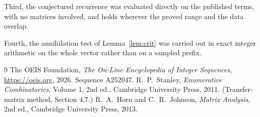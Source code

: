 \documentclass[11pt,a4paper]{article}
\theoremstyle{plain}
\theoremstyle{definition}
\begin{document}
Third, the conjectured recurrence was evaluated directly on the published terms, with no
matrices involved, and holds wherever the proved range and the data overlap.

Fourth, the annihilation test of Lemma~\ref{lem:crit} was carried out in exact integer
arithmetic on the whole vector rather than on a sampled prefix.

\begin{thebibliography}{9}
 The OEIS Foundation, \emph{The On-Line Encyclopedia of Integer
Sequences}, \url{https://oeis.org}, 2026. Sequence A252047.
 R.~P.~Stanley, \emph{Enumerative Combinatorics}, Volume 1, 2nd ed.,
Cambridge University Press, 2011. (Transfer-matrix method, Section 4.7.)
 R.~A.~Horn and C.~R.~Johnson, \emph{Matrix Analysis}, 2nd ed., Cambridge
University Press, 2013.
\end{thebibliography}
\end{document}

